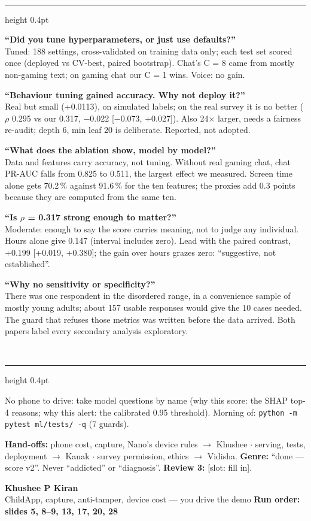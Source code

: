 \documentclass[10pt,a4paper]{article}
\newcommand{\person}[3]{%
  \begin{tcolorbox}[colback=navy,colframe=navy,boxsep=1.5mm,left=3mm,right=3mm,top=1.5mm,bottom=1.5mm]
  {\color{white}\Large\bfseries #1}\\[1mm]
  {\color{white!80!navy}\small #2 \hfill \textbf{Run order: #3}}
  \end{tcolorbox}\vspace{1mm}}
\newcommand{\sect}[1]{\vspace{2mm}{\color{teal}\bfseries\small\MakeUppercase{#1}}\\[0.6mm]\hrule height 0.4pt\vspace{1.2mm}}
\newcommand{\qa}[2]{\begin{minipage}{\linewidth}\small\textbf{\color{navy}#1}\\[0.3mm]\color{black!85}#2\end{minipage}\vspace{1.6mm}}
\begin{document}
\sect{Hardest Review 3 questions}
\qa{``Did you tune hyperparameters, or just use defaults?''}{Tuned: 188 settings, cross-validated on training data only; each test set scored once (deployed vs CV-best, paired bootstrap). Chat's C = 8 came from mostly non-gaming text; on gaming chat our C = 1 wins. Voice: no gain.}
\qa{``Behaviour tuning gained accuracy. Why not deploy it?''}{Real but small (+0.0113), on simulated labels; on the real survey it is no better ($\rho$ 0.295 vs our 0.317, $-$0.022 [$-$0.073, +0.027]). Also 24$\times$ larger, needs a fairness re-audit; depth 6, min leaf 20 is deliberate. Reported, not adopted.}
\qa{``What does the ablation show, model by model?''}{Data and features carry accuracy, not tuning. Without real gaming chat, chat PR-AUC falls from 0.825 to 0.511, the largest effect we measured. Screen time alone gets 70.2\,\% against 91.6\,\% for the ten features; the proxies add 0.3 points because they are computed from the same ten.}
\qa{``Is $\rho$ = 0.317 strong enough to matter?''}{Moderate: enough to say the score carries meaning, not to judge any individual. Hours alone give 0.147 (interval includes zero). Lead with the paired contrast, +0.199 [+0.019, +0.380]; the gain over hours grazes zero: ``suggestive, not established''.}
\qa{``Why no sensitivity or specificity?''}{There was one respondent in the disordered range, in a convenience sample of mostly young adults; about 157 usable responses would give the 10 cases needed. The guard that refuses those metrics was written before the data arrived. Both papers label every secondary analysis exploratory.}

\sect{Demo role}
{\small No phone to drive: take model questions by name (why this score: the SHAP top-4 reasons; why this alert: the calibrated 0.95 threshold). Morning of: \texttt{python -m pytest ml/tests/ -q} (7 guards).\par}

\vfill
{\color{greyt}\footnotesize \textbf{Hand-offs:} phone cost, capture, Nano's device rules $\to$ Khushee $\cdot$ serving, tests, deployment $\to$ Kanak $\cdot$ survey permission, ethics $\to$ Vidisha. \textbf{Genre:} ``done --- score v2''. Never ``addicted'' or ``diagnosis''. \textbf{Review 3:} [slot: fill in].\par}

\newpage
\person{Khushee P Kiran}{ChildApp, capture, anti-tamper, device cost --- you drive the demo}{slides 5, 8--9, 13, 17, 20, 28}
\end{document}
